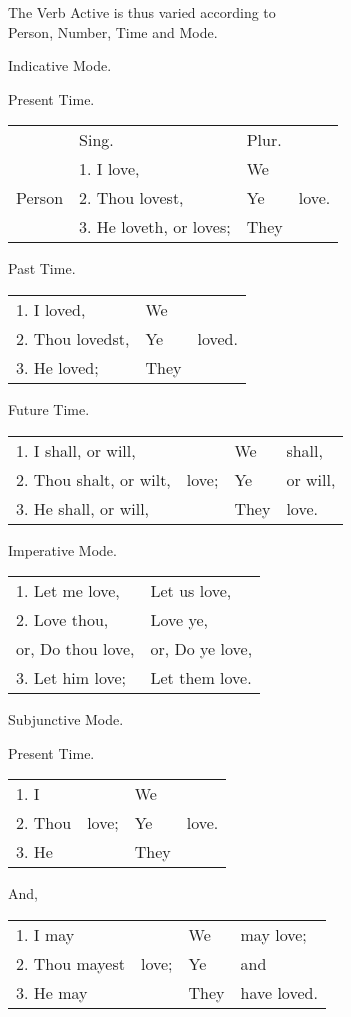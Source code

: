 \begin{center}
  The Verb Active is thus varied according to\\
  Person, Number, Time and Mode.

  Indicative Mode.

  Present Time.

  \begin{tabular}[h]{llll}
    & Sing. & Plur.\\
    & 1. I love, & We\\
    Person & 2. Thou lovest, & Ye & love.\\
    & 3. He loveth, or loves; & They\\
  \end{tabular}

  Past Time.

  \begin{tabular}[h]{lll}
    1. I loved, & We\\
    2. Thou lovedst, & Ye & loved.\\
    3. He loved; & They\\
  \end{tabular}

  Future Time.

  \begin{tabular}[h]{llll}
    1. I shall, or will, & & We & shall,\\
    2. Thou shalt, or wilt, & love; & Ye & or will,\\
    3. He shall, or will, & & They & love.\\
  \end{tabular}

  Imperative Mode.

  \begin{tabular}[h]{ll}
    1. Let me love, & Let us love,\footnotemark\\
    2. Love thou, & Love ye,\\
    or, Do thou love, & or, Do ye love,\\
    3. Let him love; & Let them love.\\
  \end{tabular}

  Subjunctive Mode.

  Present Time.

  \begin{tabular}[h]{llll}
    1. I & & We\\
    2. Thou & love; & Ye & love.\\
    3. He & & They\\
  \end{tabular}

  And,

  \begin{tabular}[h]{llll}
    1. I may & & We & may love;\\
    2. Thou mayest & love; & Ye & and\\
    3. He may & & They & have loved.\footnotemark\\
  \end{tabular}
\end{center}

